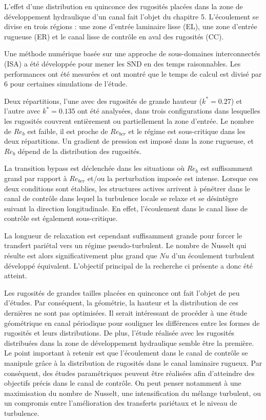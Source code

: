 \vspace{1cm}
L'effet d'une distribution en quinconce des rugosités placées dans la zone de développement hydraulique d'un canal fait l'objet du chapitre 5. L'écoulement se divise en trois régions : une zone d'entrée laminaire lisse (EL), une zone d'entrée rugueuse (ER) et le canal lisse de contrôle en aval des rugosités (CC). 

Une méthode numérique basée sur une approche de sous-domaines interconnectés (ISA) a été développée pour mener les SND en des temps raisonnables. Les performances ont été mesurées et ont montré que le temps de calcul est divisé par $6$ pour certaines simulations de l'étude. 

Deux répartitions, l'une avec des rugosités de grande hauteur ($k^{*}=0.27$) et l'autre avec $k^{*}=0.135$ ont été analysées, dans trois configurations dans lesquelles les rugosités couvrent entièrement ou partiellement la zone d'entrée. Le nombre de $Re_{b}$ est faible, il est proche de $Re_{bcr}$ et le régime est sous-critique dans les deux répartitions. Un gradient de pression est imposé dans la zone rugueuse, et $Re_{b}$ dépend de la distribution des rugosités. 

La transition bypass est déclenchée dans les situations où $Re_{b}$ est suffisamment grand par rapport à $Re_{bcr}$ et/ou la perturbation imposée est intense. Lorsque ces deux conditions sont établies, les structures actives arrivent à pénétrer dans le canal de contrôle dans lequel la turbulence locale se relaxe et se désintègre suivant la direction longitudinale. En effet, l'écoulement dans le canal lisse de contrôle est également sous-critique. 

La longueur de relaxation est cependant suffisamment grande pour forcer le transfert pariétal vers un régime pseudo-turbulent. Le nombre de Nusselt qui résulte est alors significativement plus grand que $Nu$ d'un écoulement turbulent développé équivalent. L'objectif principal de la recherche ci présente a donc été atteint.

\clearpage
Les rugosités de grandes tailles placées en quinconce ont fait l'objet de peu d'études. Par conséquent, la géométrie, la hauteur et la distribution de ces dernières ne sont pas optimisées. Il serait intéressant de procéder à une étude géométrique en canal périodique pour souligner les différences entre les formes de rugosités et leurs distributions. De plus, l’étude réalisée avec les rugosités distribuées dans la zone de développement hydraulique semble être la première. Le point important à retenir est que l’écoulement dans le canal de contrôle se manipule grâce à la distribution de rugosités dans le canal laminaire rugueux. Par conséquent, des études paramétriques peuvent être réalisées afin d’atteindre des objectifs précis dans le canal de contrôle. On peut penser notamment à une maximisation du nombre de Nusselt, une intensification du mélange turbulent, ou un compromis entre l’amélioration des transferts pariétaux et le niveau de turbulence.\\

